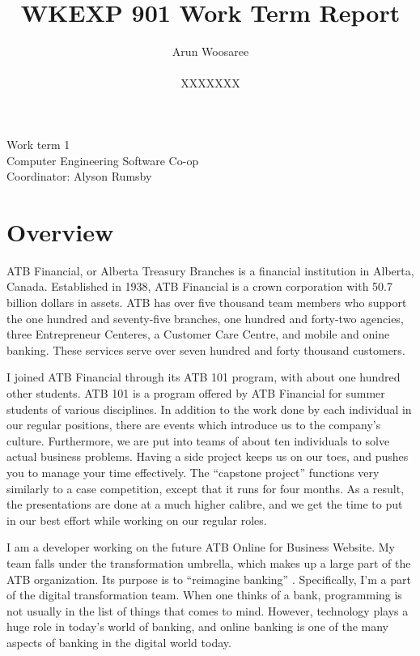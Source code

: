 \documentclass[letterpaper,12pt]{article}
\title{WKEXP 901 Work Term Report}
\author{Arun Woosaree \\ \\  XXXXXXX}
\begin{document}
\relax
\begin{titlepage}
 \maketitle
 \thispagestyle{empty} %
 \centering
 \large
 \vspace{1cm}
 Work term 1\\
 \vspace{1cm}
 Computer Engineering Software Co-op \\
 \vspace{1cm}
 Coordinator: Alyson Rumsby
\end{titlepage}

\section{Overview}

ATB Financial, or Alberta Treasury Branches is a financial institution in Alberta, Canada.
Established in 1938, ATB Financial is a crown corporation with 50.7 billion dollars in assets.\cite{annualreport2018}
ATB has over five thousand team members who support the one hundred and seventy-five branches, one hundred and forty-two
agencies, three Entrepreneur Centeres, a Customer Care Centre, and mobile and onine banking.
These services serve over seven hundred and forty thousand customers. \cite{annualreport2018, annualreport2017}

I joined ATB Financial through its ATB 101 program, with about one hundred other students.
ATB 101 is a program offered by ATB Financial for summer students of various disciplines. 
In addition to the work done by each individual
in our regular positions, there are events which introduce us to the company's culture.
Furthermore, we are put into teams of about ten individuals to solve actual business problems.
Having a side project keeps us on our toes, and pushes you to manage your time effectively.
The ``capstone project'' functions very similarly to a case competition, except that it runs 
for four months. As a result, the presentations are done at a much higher calibre, and we get 
the time to put in our best effort while working on our regular roles.

I am a developer working on the future ATB Online for Business Website. My team falls under the
transformation umbrella, which
makes up a large part of the ATB organization. Its purpose is to ``reimagine banking'' \cite{atbstory}.
Specifically, I'm a part of the digital transformation team. When one thinks of a bank,
programming is not usually in the list of things that comes to mind. However, technology
plays a huge role in today's world of banking, and online banking is one of the many
aspects of banking in the digital world today.
\end{document}
